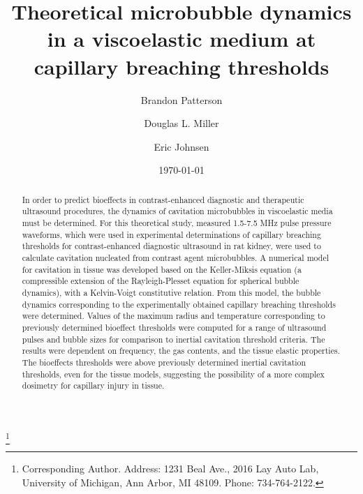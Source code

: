 \documentclass[%
preprint,%
author-year,%
]{jasatex}
\begin{document}
\title[Theoretical microbubble dynamics in a viscoelastic medium at
capillary breaching thresholds]{Theoretical microbubble dynamics in a
viscoelastic medium at capillary breaching thresholds}


\author{Brandon Patterson}
\thanks{Corresponding Author. Address: 1231 Beal Ave., 2016 Lay Auto
  Lab, University of Michigan, Ann Arbor, MI 48109. Phone:
  734-764-2122.}

\author{Douglas L. Miller}

\author{Eric Johnsen}

\date{\today}

\begin{abstract}

  In order to predict bioeffects in contrast-enhanced diagnostic and
  therapeutic ultrasound procedures, the dynamics of cavitation
  microbubbles in viscoelastic media must be determined.  For this
  theoretical study, measured 1.5-7.5 MHz pulse pressure waveforms,
  which were used in experimental determinations of capillary
  breaching thresholds for contrast-enhanced diagnostic ultrasound in
  rat kidney, were used to calculate cavitation nucleated from
  contrast agent microbubbles.  A numerical model for cavitation in
  tissue was developed based on the Keller-Miksis equation (a
  compressible extension of the Rayleigh-Plesset equation for
  spherical bubble dynamics), with a Kelvin-Voigt constitutive relation. From
  this model, the bubble dynamics corresponding to the experimentally
  obtained capillary breaching thresholds were determined. Values of
  the maximum radius and temperature corresponding to previously
  determined bioeffect thresholds were computed for a range of
  ultrasound pulses and bubble sizes for comparison to inertial
  cavitation threshold criteria.  The results were dependent on
  frequency, the gas contents, and the tissue elastic properties.  The
  bioeffects thresholds were above previously determined inertial
  cavitation thresholds, even for the tissue models, suggesting the
  possibility of a more complex dosimetry for capillary injury in
  tissue.

\end{abstract}
\end{document}
